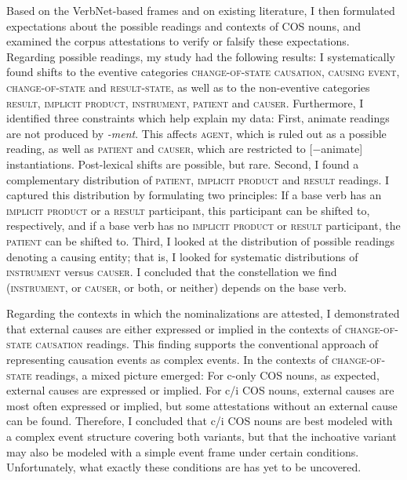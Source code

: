 Based on the VerbNet-based frames and on existing literature, I then formulated expectations about the possible readings and contexts of COS nouns, and examined the corpus attestations to verify or falsify these expectations. 
  Regarding possible readings, my study had the following results: 
  I systematically found shifts to the eventive categories \textsc{change-of-state causation, causing event, change-of-state} and \textsc{result-state}, as well as to the non-eventive categories \textsc{result, implicit product, instrument, patient} and \textsc{causer}. 
  Furthermore, I identified three constraints which help explain my data: 
  First, animate readings are not produced by \textit{-ment}. This affects \textsc{agent}, which is ruled out as a possible reading, as well as  \textsc{patient} and \textsc{causer}, which are restricted to \mbox{[−animate]} instantiations. Post-lexical shifts are possible, but rare.
  Second, I found a complementary distribution of \textsc{patient, implicit product} and \textsc{result} readings. I captured this distribution by formulating two principles: If a base verb has an \textsc{implicit product} or a \textsc{result} participant, this participant can be shifted to, respectively, and if a base verb has no \textsc{implicit product} or \textsc{result} participant, the \textsc{patient} can be shifted to. 
  Third, I looked at the distribution of possible readings denoting a causing entity; that is, I looked for systematic distributions of \textsc{instrument} versus \textsc{causer}. I concluded that the constellation we find (\textsc{instrument}, or \textsc{causer}, or both, or neither) depends on the base verb.


Regarding the contexts in which the nominalizations are attested, I demonstrated that external causes are either expressed or implied in the contexts of \textsc{change-of-state causation} readings. This finding supports the conventional approach of representing causation events as complex events. 
In the contexts of \mbox{\textsc{change-of-state}} readings, a mixed picture emerged: 
For c-only COS nouns, as expected, external causes are expressed or implied. 
For c/i COS nouns, external causes are most often expressed or implied, but some attestations without an external cause can be found. 
Therefore, I concluded that c/i COS nouns are best modeled with a complex event structure covering both variants, but that the inchoative variant may also be modeled with a simple event frame under certain conditions. Unfortunately, what exactly these conditions are has yet to be uncovered.

